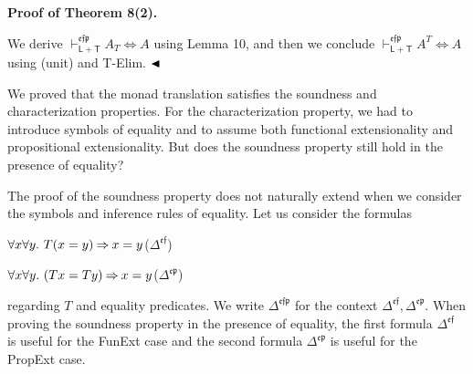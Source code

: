  
 
\par\medskip\noindent\textbf{Proof of Theorem 8(2).}\par
 
 
We derive $\vdash_{\mathsf{L}+\mathsf{T}}^{\mathfrak{e}\mathfrak{f}\mathfrak{p}}A_{T}\Leftrightarrow
A$ using Lemma 10, and then we conclude $\vdash_{\mathsf{L}+\mathsf{T}}^{\mathfrak{e}\mathfrak{f}\mathfrak{p}}A^{T}\Leftrightarrow
A$ using (unit) and T-Elim. $\hfill\blacktriangleleft$\par
 
 
 
We proved that the monad translation satisfies the soundness and characterization properties. For the characterization property, we had to introduce symbols of equality and to assume both functional extensionality and propositional extensionality. But does the soundness property still hold in the presence of equality?\par
 
 
 
The proof of the soundness property does not naturally extend when we consider the symbols and inference rules of equality. Let us consider the formulas\par
  
\par  \quad  $\displaystyle{\forall}x{\forall}y.\leavevmode\nobreak\ T(x=y)\mathbin{\Rightarrow}x=y$\quad  \quad  ($\Delta^{\mathfrak{e}\mathfrak{f}}$)\quad  
 
\par  \quad  $\displaystyle{\forall}x{\forall}y.\leavevmode\nobreak\ (Tx=Ty)\mathbin{\Rightarrow}x=y$\quad  \quad  ($\Delta^{\mathfrak{e}\mathfrak{p}}$)\quad  
  
regarding $T$ and equality predicates. We write $\Delta^{\mathfrak{e}\mathfrak{f}\mathfrak{p}}$ for the context $\Delta^{\mathfrak{e}\mathfrak{f}},\Delta^{\mathfrak{e}\mathfrak{p}}$. When proving the soundness property in the presence of equality, the first formula $\Delta^{\mathfrak{e}\mathfrak{f}}$ is useful for the FunExt case and the second formula $\Delta^{\mathfrak{e}\mathfrak{p}}$ is useful for the PropExt case.\par
 
